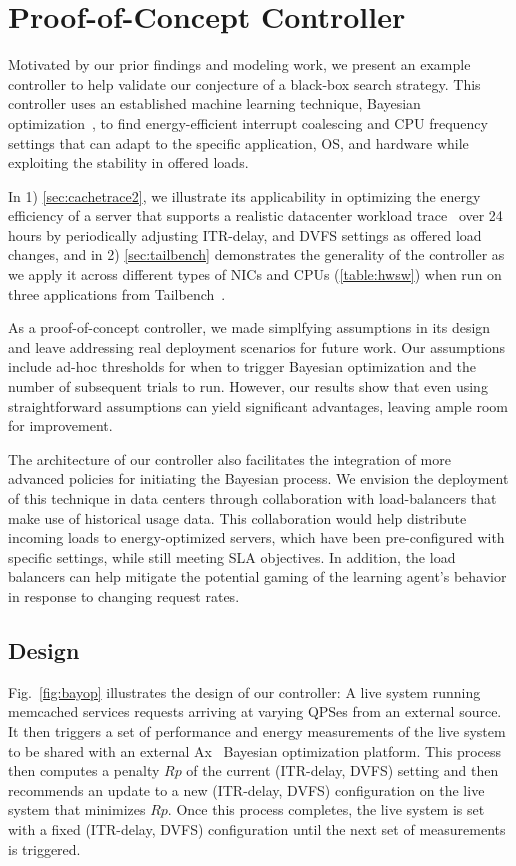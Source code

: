 \section{Proof-of-Concept Controller}
\label{sec:cachetrace}
Motivated by our prior findings and modeling work, we present an example controller to help validate our conjecture of a black-box search strategy. This controller uses an established machine learning technique, Bayesian optimization~\cite{frazier, garnett_bayesoptbook_2022}, to find energy-efficient interrupt coalescing and CPU frequency settings that can adapt to the specific application, OS, and hardware while exploiting the stability in offered loads. 

In 1) \cref{sec:cachetrace2}, we illustrate its applicability in optimizing the energy efficiency of a server that supports a realistic datacenter workload trace~\cite{cacheWorkload-OSDI20} over 24 hours by periodically adjusting ITR-delay, and DVFS settings as offered load changes, and in 2) \cref{sec:tailbench} demonstrates the generality of the controller as we apply it across different types of NICs and CPUs (\cref{table:hwsw}) when run on three applications from Tailbench~\cite{tailbench}.

As a proof-of-concept controller, we made simplfying assumptions in its design and leave addressing real deployment scenarios for future work. Our assumptions include ad-hoc thresholds for when to trigger Bayesian optimization and the number of subsequent trials to run. However, our results show that even using straightforward assumptions can yield significant advantages, leaving ample room for improvement.

The architecture of our controller also facilitates the integration of more advanced policies for initiating the Bayesian process. We envision the deployment of this technique in data centers through collaboration with load-balancers that make use of historical usage data. This collaboration would help distribute incoming loads to energy-optimized servers, which have been pre-configured with specific settings, while still meeting SLA objectives. In addition, the load balancers can help mitigate the potential gaming of the learning agent's behavior in response to changing request rates.

\subsection{Design}
Fig.~\ref{fig:bayop} illustrates the design of our  controller:  A live system running memcached services requests arriving at varying QPSes from an external source.  It then triggers a set of performance and energy measurements of the live system to be shared with an external Ax~\cite{ax, Bakshy2018AEAD} Bayesian optimization platform.  This process then computes a penalty $Rp$ of the current (ITR-delay, DVFS) setting and  then recommends an update to a new (ITR-delay, DVFS) configuration on the live system that minimizes $Rp$. Once this process completes, the live system is set with a fixed (ITR-delay, DVFS) configuration until the next set of measurements is triggered.

